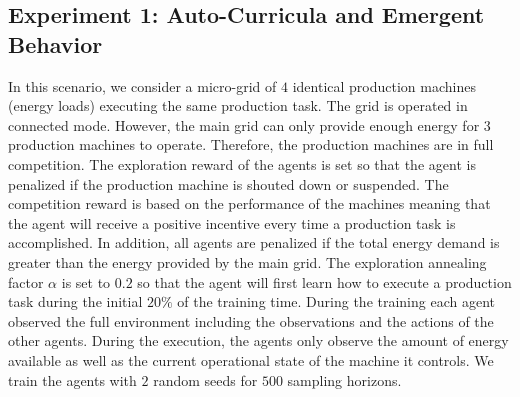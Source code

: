 \subsection{Experiment 1: Auto-Curricula and Emergent Behavior}
\label{subsec:51}
In this scenario, we consider a micro-grid of $4$ identical production machines (energy loads) executing the same production task. The grid is operated in connected mode. However, the main grid can only provide enough energy for $3$ production machines to operate. Therefore, the production machines are in full competition. The exploration reward of the agents is set so that the agent is penalized if the production machine is shouted down or suspended. The competition reward is based on the performance of the machines meaning that the agent will receive a positive incentive every time a production task is accomplished. In addition, all agents are penalized if the total energy demand is greater than the energy provided by the main grid. The exploration annealing factor $\alpha$ is set to $0.2$ so that the agent will first learn how to execute a production task during the initial $20\%$ of the training time. During the training each agent observed the full environment including the observations and the actions of the other agents. During the execution, the agents only observe the amount of energy available as well as the current operational state of the machine it controls. We train the agents with $2$ random seeds for $500$ sampling horizons.

